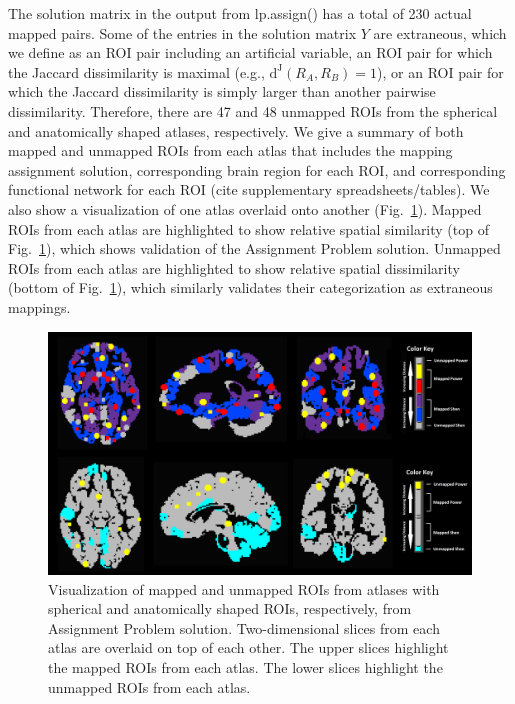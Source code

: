 \documentclass[10pt,letterpaper]{article}\usepackage[]{graphicx}\usepackage[]{color}
\begin{document}
The solution matrix in the output from \textsf{lp.assign()} has a total of 230 actual mapped pairs. Some of the entries in the solution matrix $Y$ are extraneous, which we define as an ROI pair including an artificial variable, an ROI pair for which the Jaccard dissimilarity is maximal (e.g., $\text{d}^\text{J}(R_A,R_B)=1$), or an ROI pair for which the Jaccard dissimilarity is simply larger than another pairwise dissimilarity. Therefore, there are 47 and 48 unmapped ROIs from the spherical and anatomically shaped atlases, respectively. We give a summary of both mapped and unmapped ROIs from each atlas that includes the mapping assignment solution, corresponding brain region for each ROI, and corresponding functional network for each ROI (cite supplementary spreadsheets/tables). We also show a visualization of one atlas overlaid onto another (Fig.~\ref{fig:power_shen_mapped-unmapped}). Mapped ROIs from each atlas are highlighted to show relative spatial similarity (top of Fig.~\ref{fig:power_shen_mapped-unmapped}), which shows validation of the Assignment Problem solution. Unmapped ROIs from each atlas are highlighted to show relative spatial dissimilarity (bottom of Fig.~\ref{fig:power_shen_mapped-unmapped}), which similarly validates their categorization as extraneous mappings.

\begin{figure}[h!]
\centering
\includegraphics[width=1\textwidth,clip,trim=0cm 0cm 0cm 0.0cm]{mapped-unmapped-montage.png}
\caption{Visualization of mapped and unmapped ROIs from atlases with spherical and anatomically shaped ROIs, respectively, from Assignment Problem solution. Two-dimensional slices from each atlas are overlaid on top of each other. The upper slices highlight the mapped ROIs from each atlas. The lower slices highlight the unmapped ROIs from each atlas.}\label{fig:power_shen_mapped-unmapped}
\end{figure}
\end{document}
